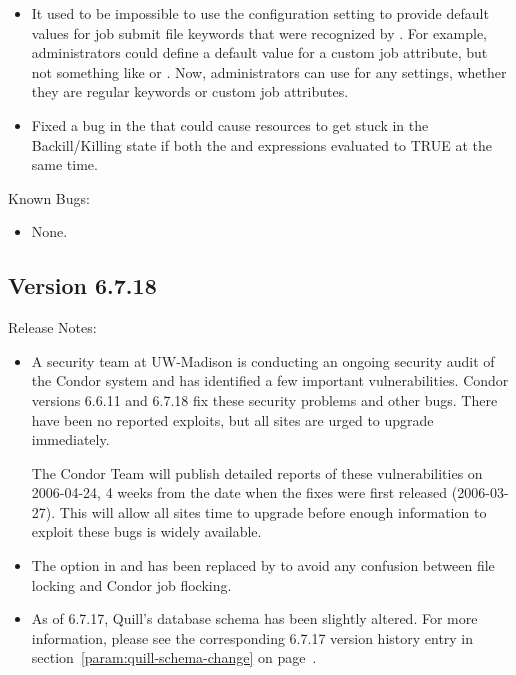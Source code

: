 \begin{itemize}
\item It used to be impossible to use the 
  configuration setting to provide default values for job submit file
  keywords that were recognized by .
  For example, administrators could define a default value for a
  custom job attribute, but not something like  or
  .
  Now, administrators can use  for any
  settings, whether they are regular  keywords or
  custom job attributes.

\item Fixed a bug in the  that could cause resources to
  get stuck in the Backill/Killing state if both the
   and  expressions
  evaluated to TRUE at the same time.

\end{itemize}


\noindent Known Bugs:

\begin{itemize}

\item None.

\end{itemize}


\subsection*{\label{sec:New-6-7.18}Version 6.7.18}

\noindent Release Notes:

\begin{itemize}

\item A security team at UW-Madison is conducting an ongoing security
audit of the Condor system and has identified a few important
vulnerabilities.
Condor versions 6.6.11 and 6.7.18 fix these security problems and
other bugs.
There have been no reported exploits, but all sites are urged to
upgrade immediately.

The Condor Team will publish detailed reports of these vulnerabilities
on 2006-04-24, 4 weeks from the date when the fixes were first
released (2006-03-27).
This will allow all sites time to upgrade before enough information to
exploit these bugs is widely available.

\item The  option in  and
   has been replaced by  to avoid
  any confusion between file locking and Condor job flocking.

\item As of 6.7.17, Quill's database schema has been slightly altered. 
For more information, please see the corresponding 6.7.17 version history entry in 
section~\ref{param:quill-schema-change} on page~\pageref{param:quill-schema-change}.

\end{itemize}

